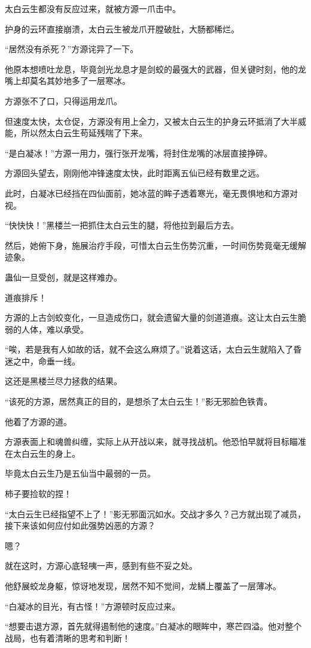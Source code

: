 \begin{this_body}
太白云生都没有反应过来，就被方源一爪击中。

护身的云环直接崩溃，太白云生被龙爪开膛破肚，大肠都稀烂。

“居然没有杀死？”方源诧异了一下。

他原本想喷吐龙息，毕竟剑光龙息才是剑蛟的最强大的武器，但关键时刻，他的龙嘴上却莫名其妙地多了一层寒冰。

方源张不了口，只得运用龙爪。

但速度太快，太仓促，方源没有用上全力，又被太白云生的护身云环抵消了大半威能，所以然太白云生苟延残喘了下来。

“是白凝冰！”方源一用力，强行张开龙嘴，将封住龙嘴的冰层直接挣碎。

方源回头望去，刚刚他冲锋速度太快，此时距离五仙已经有数里之远。

此时，白凝冰已经挡在四仙面前，她冰蓝的眸子透着寒光，毫无畏惧地和方源对视。

“快快快！”黑楼兰一把抓住太白云生的腿，将他拉到最后方去。

然后，她俯下身，施展治疗手段，可惜太白云生伤势沉重，一时间伤势竟毫无缓解迹象。

蛊仙一旦受创，就是这样难办。

道痕排斥！

方源的上古剑蛟变化，一旦造成伤口，就会遗留大量的剑道道痕。这让太白云生脆弱的人体，难以承受。

“唉，若是我有人如故的话，就不会这么麻烦了。”说着这话，太白云生就陷入了昏迷之中，命垂一线。

这还是黑楼兰尽力拯救的结果。

“该死的方源，居然真正的目的，是想杀了太白云生！”影无邪脸色铁青。

他着了方源的道。

方源表面上和魂兽纠缠，实际上从开战以来，就寻找战机。他恐怕早就将目标瞄准在太白云生的身上。

毕竟太白云生乃是五仙当中最弱的一员。

柿子要捡软的捏！

“太白云生已经指望不上了！”影无邪面沉如水。交战才多久？己方就出现了减员，接下来该如何应付如此强势凶恶的方源？

嗯？

就在这时，方源心底轻咦一声，感到有些不妥之处。

他舒展蛟龙身躯，惊讶地发现，居然不知不觉间，龙鳞上覆盖了一层薄冰。

“白凝冰的目光，有古怪！”方源顿时反应过来。

“想要击退方源，首先就得遏制他的速度。”白凝冰的眼眸中，寒芒四溢。他对整个战局，也有着清晰的思考和判断！

\end{this_body}


